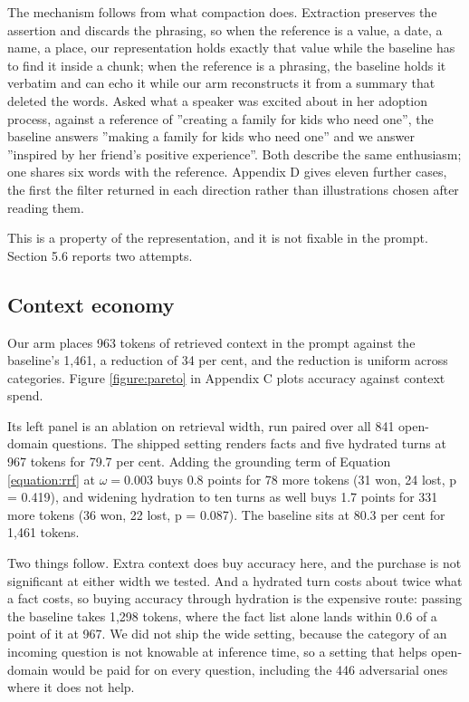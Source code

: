 \documentclass[10pt,a4paper,twocolumn]{article}
\begin{document}
The mechanism follows from what compaction does. Extraction preserves the assertion and discards the phrasing, so when the reference is a value, a date, a name, a place, our representation holds exactly that value while the baseline has to find it inside a chunk; when the reference is a phrasing, the baseline holds it verbatim and can echo it while our arm reconstructs it from a summary that deleted the words. Asked what a speaker was excited about in her adoption process, against a reference of ''creating a family for kids who need one'', the baseline answers ''making a family for kids who need one'' and we answer ''inspired by her friend's positive experience''. Both describe the same enthusiasm; one shares six words with the reference. Appendix D gives eleven further cases, the first the filter returned in each direction rather than illustrations chosen after reading them.

This is a property of the representation, and it is not fixable in the prompt. Section 5.6 reports two attempts.

\subsection{Context economy}

Our arm places 963 tokens of retrieved context in the prompt against the baseline's 1,461, a reduction of 34 per cent, and the reduction is uniform across categories. Figure \ref{figure:pareto} in Appendix C plots accuracy against context spend.

Its left panel is an ablation on retrieval width, run paired over all 841 open-domain questions. The shipped setting renders facts and five hydrated turns at 967 tokens for 79.7 per cent. Adding the grounding term of Equation \ref{equation:rrf} at $\omega = 0.003$ buys 0.8 points for 78 more tokens (31 won, 24 lost, p = 0.419), and widening hydration to ten turns as well buys 1.7 points for 331 more tokens (36 won, 22 lost, p = 0.087). The baseline sits at 80.3 per cent for 1,461 tokens.

Two things follow. Extra context does buy accuracy here, and the purchase is not significant at either width we tested. And a hydrated turn costs about twice what a fact costs, so buying accuracy through hydration is the expensive route: passing the baseline takes 1,298 tokens, where the fact list alone lands within 0.6 of a point of it at 967. We did not ship the wide setting, because the category of an incoming question is not knowable at inference time, so a setting that helps open-domain would be paid for on every question, including the 446 adversarial ones where it does not help.
\end{document}
